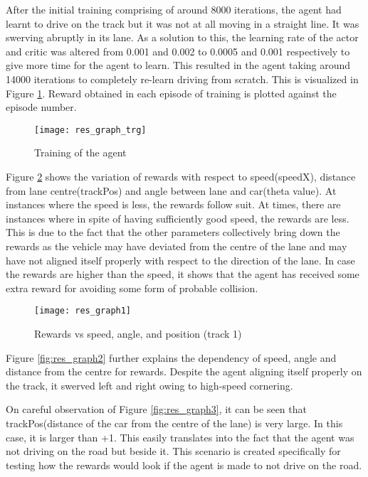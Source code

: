 After the initial training comprising of around 8000 iterations, the agent had learnt to drive on the track but it was not at all moving in a straight line. It was swerving abruptly in its lane. As a solution to this, the learning rate of the actor and critic was altered from 0.001 and 0.002 to 0.0005 and 0.001 respectively to give more time for the agent to learn. This resulted in the agent taking around 14000 iterations to completely re-learn driving from scratch. This is visualized in Figure \ref{fig:res_graph_trg}. Reward obtained in each episode of training is plotted against the episode number. 


\begin{figure}[h]
	\centering
	\texttt{[image: res\_graph\_trg]}
	\caption{Training of the agent}
	\label{fig:res_graph_trg}
\end{figure}


Figure \ref{fig:res_graph1} shows the variation of rewards with respect to speed(speedX), distance from lane centre(trackPos) and angle between lane and car(theta value). At instances where the speed is less, the rewards follow suit. At times, there are instances where in spite of having sufficiently good speed, the rewards are less. This is due to the fact that the other parameters collectively bring down the rewards as the vehicle may have deviated from the centre of the lane and may have not aligned itself properly with respect to the direction of the lane. In case the rewards are higher than the speed, it shows that the agent has received some extra reward for avoiding some form of probable collision. 

\pagebreak
\newpage

\begin{figure}[h]
	\centering
	\texttt{[image: res\_graph1]}
	\caption{Rewards vs speed, angle, and position (track 1)}
	\label{fig:res_graph1}
\end{figure}




Figure \ref{fig:res_graph2} further explains the dependency of speed, angle and distance from the centre for rewards. Despite the agent aligning itself properly on the track, it swerved left and right owing to high-speed cornering. 

On careful observation of Figure \ref{fig:res_graph3}, it can be seen that trackPos(distance of the car from the centre of the lane) is very large. In this case, it is larger than +1. This easily translates into the fact that the agent was not driving on the road but beside it. This scenario is created specifically for testing how the rewards would look if the agent is made to not drive on the road. 


